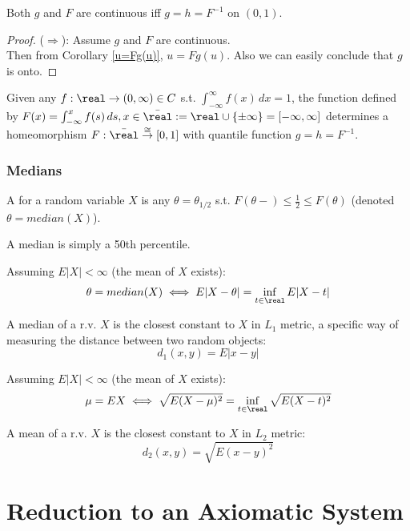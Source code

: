 \documentclass[11pt]{article}
\numberwithin{equation}{section}
\begin{document}
\proposition
Both $g$ and $F$ are continuous iff $g = h = F^{-1}$ on $(0, 1)$.
\begin{proof}
	($\Rightarrow$): Assume $g$ and $F$ are continuous. \\
	Then from Corollary \ref{u=Fg(u)}, $u = Fg(u)$. Also we can easily conclude that $g$ is onto. 
\end{proof}
 
\property
Given any $f: \real \rightarrow (0, \infty) \in C$ s.t. $\int_{-\infty}^\infty f(x)\,dx =1$, the function defined by $F(x) = \int_{-\infty}^x f(s)\,ds, x \in \bar{\real} := \real \cup \{\pm \infty\} = [-\infty, \infty]$ determines a homeomorphism $F: \bar{\real} \overset{\cong}{\rightarrow} [0, 1]$ with quantile function $g = h = F^{-1}$.

\subsubsection{Medians}
 A  for a random variable $X$ is any $\theta = \theta_{1/2}$ s.t. $F(\theta-) \leq \frac{1}{2} \leq F(\theta)$ (denoted $\theta = median(X)$).

\remark
A median is simply a 50th percentile.

\proposition Assuming $E|X| < \infty$ (the mean of $X$ exists):
\begin{equation}
	\theta = median(X) \iff E|X - \theta| = \inf_{t\in\real} E|X-t|
\end{equation}

\remark
A median of a r.v. $X$ is the closest constant to $X$ in $L_1$ metric, a specific way of measuring the distance between two random objects:
$$d_1(x,y) = E|x - y|$$

\proposition Assuming $E|X| < \infty$ (the mean of $X$ exists):
\begin{equation}
	\mu = EX \iff \sqrt{E(X-\mu)^2} = \inf_{t \in \real} \sqrt{E(X-t)^2}
\end{equation}

\remark
A mean of a r.v. $X$ is the closest constant to $X$ in $L_2$ metric:
$$d_2(x,y) = \sqrt{E(x-y)^2}$$

\section{Reduction to an Axiomatic System}
\end{document}
